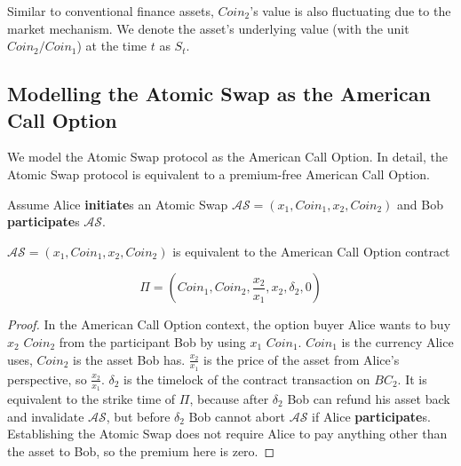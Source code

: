 Similar to conventional finance assets, $Coin_2$'s value is also fluctuating due to the market mechanism.
We denote the asset's underlying value (with the unit $Coin_2 / Coin_1$) at the time $t$ as $S_t$.















\subsection{Modelling the Atomic Swap as the American Call Option}

We model the Atomic Swap protocol as the American Call Option.
In detail, the Atomic Swap protocol is equivalent to a premium-free American Call Option.

Assume Alice \textbf{initiate}s an Atomic Swap $\mathcal{AS} = (x_1, Coin_1, x_2, Coin_2)$ and Bob \textbf{participate}s $\mathcal{AS}$.

\begin{theorem}
$\mathcal{AS} = (x_1, Coin_1, x_2, Coin_2)$ is equivalent to the American Call Option contract

$$
\Pi = (Coin_1, Coin_2, \frac{x_2}{x_1}, x_2, \delta_2, 0)
$$

\end{theorem}


\begin{proof}
In the American Call Option context, the option buyer Alice wants to buy $x_2$ $Coin_2$ from the participant Bob by using $x_1$ $Coin_1$.
$Coin_1$ is the currency Alice uses, $Coin_2$ is the asset Bob has.
$\frac{x_2}{x_1}$ is the price of the asset from Alice's perspective, so $\frac{x_2}{x_1}$.
$\delta_2$ is the timelock of the contract transaction on $BC_2$.
It is equivalent to the strike time of $\Pi$, because after $\delta_2$ Bob can refund his asset back and invalidate $\mathcal{AS}$, but before $\delta_2$ Bob cannot abort $\mathcal{AS}$ if Alice \textbf{participate}s.
Establishing the Atomic Swap does not require Alice to pay anything other than the asset to Bob, so the premium here is zero.
\end{proof}













